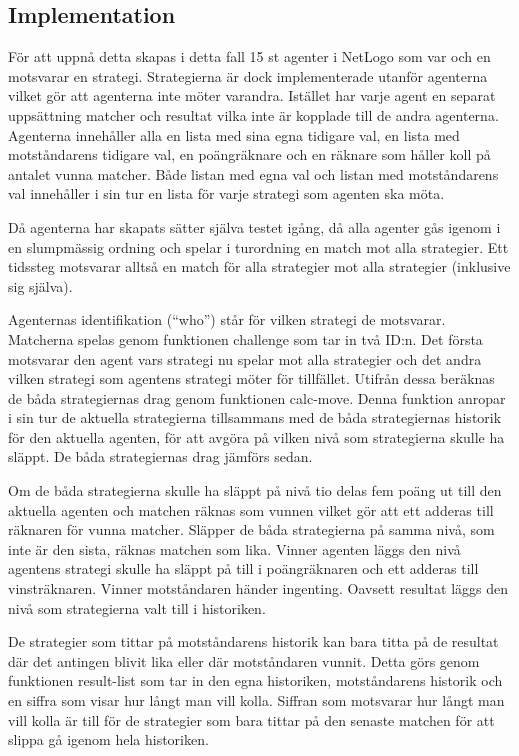 \subsection{Implementation}
För att uppnå detta skapas i detta fall 15 st agenter i NetLogo som var och en motsvarar en strategi. Strategierna är dock implementerade utanför agenterna vilket gör att agenterna inte möter varandra. Istället har varje agent en separat uppsättning matcher och resultat vilka inte är kopplade till de andra agenterna. Agenterna innehåller alla en lista med sina egna tidigare val, en lista med motståndarens tidigare val, en poängräknare och en räknare som håller koll på antalet vunna matcher. Både listan med egna val och listan med motståndarens val innehåller i sin tur en lista för varje strategi som agenten ska möta.

Då agenterna har skapats sätter själva testet igång, då alla agenter gås igenom i en slumpmässig ordning och spelar i turordning en match mot alla strategier. Ett tidssteg motsvarar alltså en match för alla strategier mot alla strategier (inklusive sig själva). 

Agenternas identifikation (“who”) står för vilken strategi de motsvarar. Matcherna spelas genom funktionen challenge som tar in två ID:n. Det första motsvarar den agent vars strategi nu spelar mot alla strategier och det andra vilken strategi som agentens strategi möter för tillfället. Utifrån dessa beräknas de båda strategiernas drag genom funktionen calc-move. Denna funktion anropar i sin tur de aktuella strategierna tillsammans med de båda strategiernas historik för den aktuella agenten, för att avgöra på vilken nivå som strategierna skulle ha släppt. De båda strategiernas drag jämförs sedan.

Om de båda strategierna skulle ha släppt på nivå tio delas fem poäng ut till den aktuella agenten och matchen räknas som vunnen vilket gör att ett adderas till räknaren för vunna matcher. Släpper de båda strategierna på samma nivå, som inte är den sista, räknas matchen som lika. Vinner agenten läggs den nivå agentens strategi skulle ha släppt på till i poängräknaren och ett adderas till vinsträknaren. Vinner motståndaren händer ingenting. Oavsett resultat läggs den nivå som strategierna valt till i historiken.

De strategier som tittar på motståndarens historik kan bara titta på de resultat där det antingen blivit lika eller där motståndaren vunnit. Detta görs genom funktionen result-list som tar in den egna historiken, motståndarens historik och en siffra som visar hur långt man vill kolla. Siffran som motsvarar hur långt man vill kolla är till för de strategier som bara tittar på den senaste matchen för att slippa gå igenom hela historiken.

